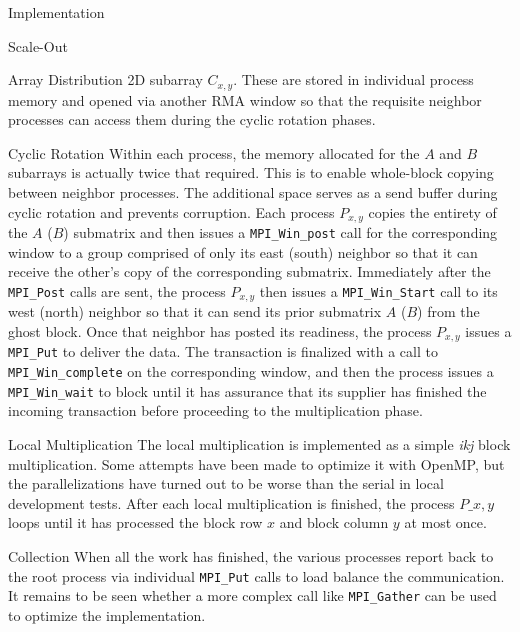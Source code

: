 \documentclass{article}
\begin{document}
\begin{section}{Implementation}
\begin{subsection}{Scale-Out}
\begin{paragraph}{Array Distribution}
      2D subarray $C_{x,y}$. These are stored in individual process memory and opened via another RMA window so that the requisite neighbor processes
      can access them during the cyclic rotation phases.
    \end{paragraph}
    \begin{paragraph}{Cyclic Rotation}
      Within each process, the memory allocated for the $A$ and $B$ subarrays is actually twice that required. This is to enable whole-block copying
      between neighbor processes. The additional space serves as a send buffer during cyclic rotation and prevents corruption. Each process $P_{x,y}$
      copies the entirety of the $A$ ($B$) submatrix and then issues a \texttt{MPI\_Win\_post} call for the corresponding window to a group comprised of
      only its east (south) neighbor so that it can receive the other's copy of the corresponding submatrix. Immediately after the \texttt{MPI\_Post}
      calls are sent, the process $P_{x,y}$ then issues a \texttt{MPI\_Win\_Start} call to its west (north) neighbor so that it can send its prior submatrix
      $A$ ($B$) from the ghost block. Once that neighbor has posted its readiness, the process $P_{x,y}$ issues a \texttt{MPI\_Put} to deliver the data.
      The transaction is finalized with a call to \texttt{MPI\_Win\_complete} on the corresponding window, and then the process issues a \texttt{MPI\_Win\_wait}
      to block until it has assurance that its supplier has finished the incoming transaction before proceeding to the multiplication phase.
    \end{paragraph}
    \begin{paragraph}{Local Multiplication}
      The local multiplication is implemented as a simple \emph{ikj} block multiplication. Some attempts have been made to optimize it
      with OpenMP, but the parallelizations have turned out to be worse than the serial in local development tests.
      After each local multiplication is finished, the process $P\_{x,y}$ loops until it has processed the block row $x$ and block column $y$
      at most once.
    \end{paragraph}
    \begin{paragraph}{Collection}
      When all the work has finished, the various processes report back to the root process via individual \texttt{MPI\_Put} calls to load balance
      the communication. It remains to be seen whether a more complex call like \texttt{MPI\_Gather} can be used to optimize the implementation.
    \end{paragraph}
  \end{subsection}
\end{section}
\printbibliography
\end{document}
